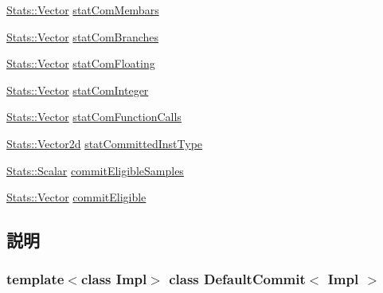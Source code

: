 \begin{DoxyCompactItemize}
\item 
\hyperlink{classStats_1_1Vector}{Stats::Vector} \hyperlink{classDefaultCommit_a9b029ac182d54199247dfa90ed86d368}{statComMembars}
\item 
\hyperlink{classStats_1_1Vector}{Stats::Vector} \hyperlink{classDefaultCommit_a39a7da0b20d1e83ccfe4b2f2b19d6e94}{statComBranches}
\item 
\hyperlink{classStats_1_1Vector}{Stats::Vector} \hyperlink{classDefaultCommit_a2be26eb7dfa8b9e36d0c6fdcaea8d818}{statComFloating}
\item 
\hyperlink{classStats_1_1Vector}{Stats::Vector} \hyperlink{classDefaultCommit_ae562968e75d903bd12352af65cc558b6}{statComInteger}
\item 
\hyperlink{classStats_1_1Vector}{Stats::Vector} \hyperlink{classDefaultCommit_acd1aba8c2f19771552212e9c2917ac6b}{statComFunctionCalls}
\item 
\hyperlink{classStats_1_1Vector2d}{Stats::Vector2d} \hyperlink{classDefaultCommit_ad0d59ba553bc001d75aff706903e2f77}{statCommittedInstType}
\item 
\hyperlink{classStats_1_1Scalar}{Stats::Scalar} \hyperlink{classDefaultCommit_a16d1a4bbb2cb87488fd876fbf6e7a518}{commitEligibleSamples}
\item 
\hyperlink{classStats_1_1Vector}{Stats::Vector} \hyperlink{classDefaultCommit_a26f5138543e43cbaba9459036fc0b04c}{commitEligible}
\end{DoxyCompactItemize}


\subsection{説明}
\subsubsection*{template$<$class Impl$>$ class DefaultCommit$<$ Impl $>$}

